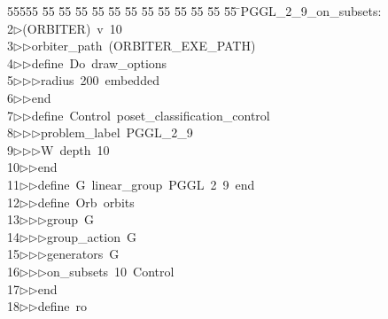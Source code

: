 %
%
\begin{tabbing}
55555 \= 55 \= 55 \= 55 \= 55 \= 55 \= 55 \= 55 \= 55 \= 55 \= 55 \= 55 \= 55 \= \>PGGL\_2\_9\_on\_subsets:\\[0pt]
2\>$\triangleright$\>(ORBITER)\ v\ 10\ \\[0pt]
3\>$\triangleright$\>$\triangleright$\>orbiter\_path\ (ORBITER\_EXE\_PATH)\ \\[0pt]
4\>$\triangleright$\>$\triangleright$\>define\ Do\ draw\_options\ \\[0pt]
5\>$\triangleright$\>$\triangleright$\>$\triangleright$\>radius\ 200\ embedded\ \\[0pt]
6\>$\triangleright$\>$\triangleright$\>end\ \\[0pt]
7\>$\triangleright$\>$\triangleright$\>define\ Control\ poset\_classification\_control\ \\[0pt]
8\>$\triangleright$\>$\triangleright$\>$\triangleright$\>problem\_label\ PGGL\_2\_9\ \\[0pt]
9\>$\triangleright$\>$\triangleright$\>$\triangleright$\>W\ depth\ 10\ \\[0pt]
10\>$\triangleright$\>$\triangleright$\>end\ \\[0pt]
11\>$\triangleright$\>$\triangleright$\>define\ G\ linear\_group\ PGGL\ 2\ 9\ end\ \\[0pt]
12\>$\triangleright$\>$\triangleright$\>define\ Orb\ orbits\ \\[0pt]
13\>$\triangleright$\>$\triangleright$\>$\triangleright$\>group\ G\ \\[0pt]
14\>$\triangleright$\>$\triangleright$\>$\triangleright$\>group\_action\ G\ \\[0pt]
15\>$\triangleright$\>$\triangleright$\>$\triangleright$\>generators\ G\ \\[0pt]
16\>$\triangleright$\>$\triangleright$\>$\triangleright$\>on\_subsets\ 10\ Control\ \\[0pt]
17\>$\triangleright$\>$\triangleright$\>end\ \\[0pt]
18\>$\triangleright$\>$\triangleright$\>define\ ro\ \\[0pt]

\end{tabbing}
